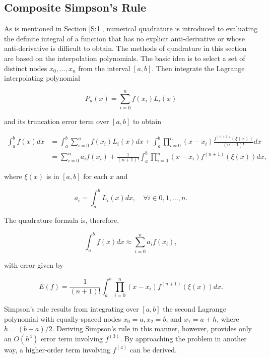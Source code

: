\documentclass[preprint,12pt]{elsarticle}
\begin{document}
\subsection{Composite Simpson's Rule}
\label{SS:2.1}

As is mentioned in Section \ref{S:1}, numerical quadrature is introduced to evaluating the definite integral of a function that has no explicit anti-derivative or whose anti-derivative is difficult to obtain. The methods of quadrature in this section are based on the interpolation polynomials. The basic idea is to select a set of distinct nodes ${x_{0},\dots,x_{n}}$ from the interval $[a,b]$. Then integrate the Lagrange interpolating polynomial

\begin{equation}
    P_{n}(x)=\sum^{n}_{i=0}{f(x_i)L_{i}(x)}
\end{equation}

and its truncation error term over $[a,b]$ to obtain

\begin{equation}
    \begin{split}
        \int_{a}^{b}f(x)dx & = \int_{a}^{b}\sum_{i=0}^{n}f(x_i)L_{i}(x)dx + \int_{a}^{b}\prod_{i=0}^{n}(x-x_i)\frac{f^{(n+1)}(\xi(x))}{(n+1)!}dx \\
        & = \sum_{i=0}^{n}a_{i}f(x_i)+\frac{1}{(n+1)!}\int_{a}^{b}\prod_{i=0}^{n}(x-x_i)f^{(n+1)}(\xi(x))dx,
    \end{split}
\end{equation}

where $\xi(x)$ is in $[a,b]$ for each $x$ and

\begin{equation}
    a_{i}=\int_{a}^{b}L_{i}(x)dx,\quad\forall i\in {0,1,\dots,n}.
\end{equation}

The quadrature formula is, therefore,

\begin{equation}
    \int_{a}^{b}f(x)dx \approx \sum_{i=0}^{n}a_{i}f(x_{i}),
\end{equation}

with error given by

\begin{equation}
    E(f)=\frac{1}{(n+1)!}\int_{a}^{b}\prod_{i=0}^{n}(x-x_i)f^{(n+1)}(\xi(x))dx.
\end{equation}

Simpson’s rule results from integrating over $[a,b]$ the second Lagrange polynomial with equally-spaced nodes $x_0 =a,x_2 =b$, and $x_1 =a+h$, where $h=(b-a)/2$. Deriving Simpson’s rule in this manner, however, provides only an $O(h^4)$ error term involving $f^{(3)}$. By approaching the problem in another way, a higher-order term involving $f^{(4)}$ can be derived.
\end{document}
